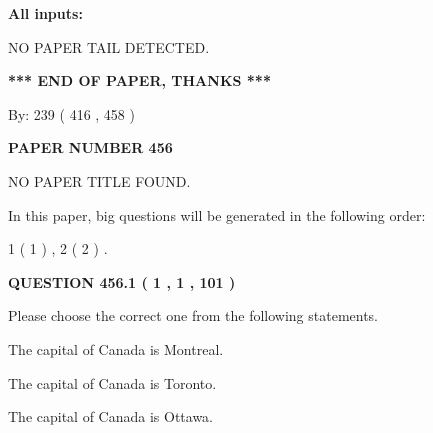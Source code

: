 \documentclass[12pt]{article}
\begin{document}
   
   
   
\noindent{}
   
   
   
   
\noindent\vspace{0.1in}\hspace{-0.08in} {\textbf{\Large{All inputs: }}}
   
   
   
   
\vspace{2.0in} NO PAPER TAIL DETECTED.
   
   
   
   
\vspace{1.0in} 
{\textbf{\large{ *** END OF PAPER, THANKS *** }}} 
   
   
\hspace{1.0in} By: 
 239 ( 416 ,  458 )
   
   
   
   
\newpage 
\setcounter{page}{ 
   456001 } 
   
   
   
   
 {\textbf{ \Large{ PAPER NUMBER  456  }}}
   
   
\vspace{0.2in}
   
   
   
   
   
   
 NO PAPER TITLE FOUND.
   
   
   
\vspace{0.2in}
   
In this paper, big questions will be generated in the following order: 
   
   
   1 ( 1 )
 ,
   2 ( 2 )
 .
  
\vspace{0.2in}
  
{\textbf{\Large{QUESTION
456.1 
 ( 1 , 1 , 101 )
}}}
  
  
Please choose the correct one from the following statements.
 
 
The capital of Canada is Montreal.
 
 
The capital of Canada is Toronto.
 
 
The capital of Canada is Ottawa.
 
\end{document}
